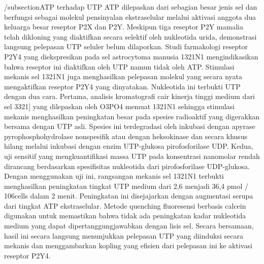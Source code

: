 /subsection{ATP terhadap UTP}
ATP dilepaskan dari sebagian besar jenis sel dan berfungsi sebagai molekul pensinyalan ekstraselular melalui aktivasi anggota dua keluarga besar reseptor P2X dan P2Y. Meskipun tiga reseptor P2Y mamalia telah dikloning yang diaktifkan secara selektif oleh nukleotida urida, demonstrasi langsung pelepasan UTP seluler belum dilaporkan. Studi farmakologi reseptor P2Y4 yang diekspresikan pada sel astrocytoma manusia 1321N1 mengindikasikan bahwa reseptor ini diaktifkan oleh UTP namun tidak oleh ATP. Stimulasi mekanis sel 1321N1 juga menghasilkan pelepasan molekul yang secara nyata mengaktifkan reseptor P2Y4 yang dinyatakan. Nukleotida ini terbukti UTP dengan dua cara. Pertama, analisis kromatografi cair kinerja tinggi medium dari sel 3321] yang dilepaskan oleh O3PO4 memuat 1321N1 sehingga stimulasi mekanis menghasilkan peningkatan besar pada spesies radioaktif yang digerakkan bersama dengan UTP asli. Spesies ini terdegradasi oleh inkubasi dengan apyrase pyrophosphohydrolase nonspesifik atau dengan heksokinase dan secara khusus hilang melalui inkubasi dengan enzim UTP-glukosa pirofosforilase UDP. Kedua, uji sensitif yang mengkuantifikasi massa UTP pada konsentrasi nanomolar rendah dirancang berdasarkan spesifisitas nukleotida dari pirofosforilase UDP-glukosa. Dengan menggunakan uji ini, rangsangan mekanis sel 1321N1 terbukti menghasilkan peningkatan tingkat UTP medium dari 2,6 menjadi 36,4 pmol / 106cells dalam 2 menit. Peningkatan ini disejajarkan dengan augmentasi serupa dari tingkat ATP ekstraselular. Metode quenching fluoresensi berbasis calcein digunakan untuk memastikan bahwa tidak ada peningkatan kadar nukleotida medium yang dapat dipertanggungjawabkan dengan lisis sel. Secara bersamaan, hasil ini secara langsung menunjukkan pelepasan UTP yang diinduksi secara mekanis dan menggambarkan kopling yang efisien dari pelepasan ini ke aktivasi reseptor P2Y4.
